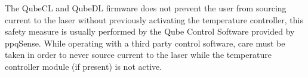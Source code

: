 \begin{tcolorbox}[enhanced,attach boxed title to top center={yshift=-3mm,yshifttext=-1mm},
                    colback=black!5!white, colframe=red!75!black, colbacktitle=red!80!black,
                    title=CAUTION, fonttitle=\bfseries, boxed title style={size=small, 
                    colframe=black!50!black} ]

    The QubeCL and QubeDL firmware does not prevent the user from sourcing current to the laser without previously activating the temperature controller, this safety measure is usually performed by the Qube Control Software provided by ppqSense.
    \newline While operating with a third party control software, care must be taken in order to never source current to the laser while the temperature controller module (if present) is not active.
\end{tcolorbox}